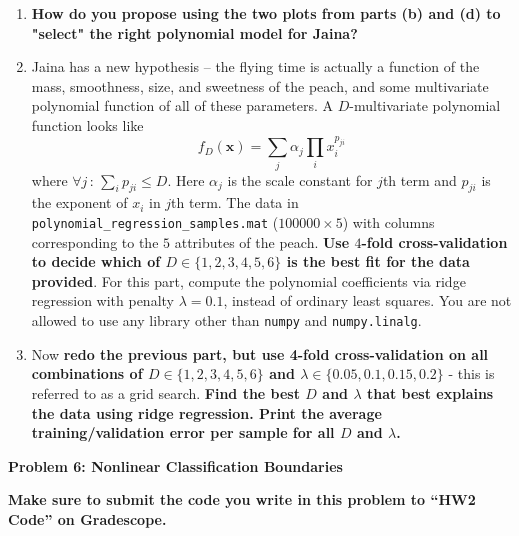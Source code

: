 \documentclass{article}\usepackage[utf8]{inputenc}\usepackage[margin=0.4cm,top=0.4cm,bottom=0.4cm]{geometry}\usepackage[usenames,dvipsnames,svgnames,table]{xcolor}
\begin{document}
\begin{enumerate}
\EndSolution
\item \textbf{How do you propose using the two plots from parts (b) and (d) to "select" the right polynomial model for Jaina?}
\BeginSolution

\EndSolution
\item Jaina has a new hypothesis -- the flying time is actually a function of the mass, smoothness, size, and sweetness of the peach, and some multivariate polynomial function of all of these parameters. A $D$-multivariate polynomial function looks like $$f_D(\mathbf{x}) = \sum_j\alpha_j\prod_i x_i^{p_{ji}}$$ where $\forall j\,:\,\sum_i p_{ji}\leqslant D$. Here $\alpha_j$ is the scale constant for $j$th term and $p_{ji}$ is the exponent of $x_i$ in $j$th term. The data in \texttt{polynomial\_regression\_samples.mat} ($100000 \times 5$) with columns corresponding to the $5$ attributes of the peach. \textbf{Use $4$-fold cross-validation to decide which of $D \in \{1, 2, 3, 4, 5, 6\}$ is the best fit for the data provided}. For this part, compute the polynomial coefficients via ridge regression with penalty $\lambda = 0.1$, instead of ordinary least squares.  You are not allowed to use any library other than \texttt{numpy} and \texttt{numpy.linalg}.
\BeginSolution

\EndSolution
\item Now \textbf{redo the previous part, but use 4-fold cross-validation on all combinations of $D \in \{1, 2,3,4,5,6\} $ and $\lambda \in \{0.05, 0.1, 0.15, 0.2\}$} - this is referred to as a grid search. \textbf{Find the best $D$ and $\lambda$ that best explains the data using ridge regression. Print the average training/validation error per sample for all $D$ and $\lambda$.}
\BeginSolution

\EndSolution
\end{enumerate}
\clearpage

\vspace{-2mm}\noindent\begin{mybox}{\begin{center}\textbf{\color{black}Problem 6: Nonlinear Classification Boundaries}\end{center}}\end{mybox}\vspace{-2mm}
\vspace{10pt}
\noindent \textbf{Make sure to submit the code you write in this problem to ``HW2 Code'' on Gradescope.}
\vspace{4pt}
\end{document}
